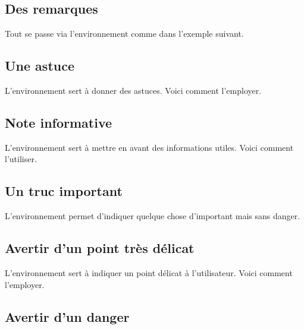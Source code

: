\subsection{Des remarques}

Tout se passe via l'environnement  comme dans l'exemple suivant.




\subsection{Une astuce}

L'environnement  sert à donner des astuces. Voici comment l'employer.




\subsection{Note informative}

L'environnement  sert à mettre en avant des informations utiles. Voici comment l'utiliser.




\subsection{Un truc important}

L'environnement  permet d'indiquer quelque chose d'important mais sans danger.




\subsection{Avertir d'un point très délicat}

L'environnement  sert à indiquer un point délicat à  l'utilisateur. Voici comment l'employer.




\subsection{Avertir d'un danger}

